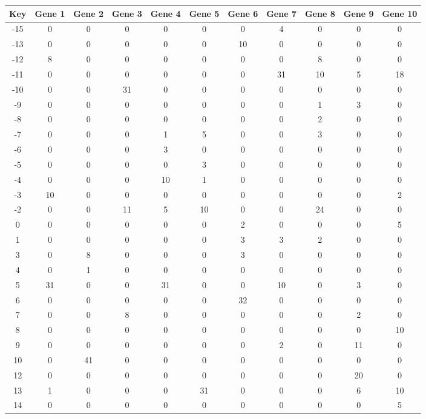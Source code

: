 \begin{tabular}{|c|c|c|c|c|c|c|c|c|c|c|}
\hline
Key & Gene 1 & Gene 2 & Gene 3 & Gene 4 & Gene 5 & Gene 6 & Gene 7 & Gene 8 & Gene 9 & Gene 10 \\
\hline
-15 & 0 & 0 & 0 & 0 & 0 & 0 & 4 & 0 & 0 & 0 \\
-13 & 0 & 0 & 0 & 0 & 0 & 10 & 0 & 0 & 0 & 0 \\
-12 & 8 & 0 & 0 & 0 & 0 & 0 & 0 & 8 & 0 & 0 \\
-11 & 0 & 0 & 0 & 0 & 0 & 0 & 31 & 10 & 5 & 18 \\
-10 & 0 & 0 & 31 & 0 & 0 & 0 & 0 & 0 & 0 & 0 \\
-9 & 0 & 0 & 0 & 0 & 0 & 0 & 0 & 1 & 3 & 0 \\
-8 & 0 & 0 & 0 & 0 & 0 & 0 & 0 & 2 & 0 & 0 \\
-7 & 0 & 0 & 0 & 1 & 5 & 0 & 0 & 3 & 0 & 0 \\
-6 & 0 & 0 & 0 & 3 & 0 & 0 & 0 & 0 & 0 & 0 \\
-5 & 0 & 0 & 0 & 0 & 3 & 0 & 0 & 0 & 0 & 0 \\
-4 & 0 & 0 & 0 & 10 & 1 & 0 & 0 & 0 & 0 & 0 \\
-3 & 10 & 0 & 0 & 0 & 0 & 0 & 0 & 0 & 0 & 2 \\
-2 & 0 & 0 & 11 & 5 & 10 & 0 & 0 & 24 & 0 & 0 \\
0 & 0 & 0 & 0 & 0 & 0 & 2 & 0 & 0 & 0 & 5 \\
1 & 0 & 0 & 0 & 0 & 0 & 3 & 3 & 2 & 0 & 0 \\
3 & 0 & 8 & 0 & 0 & 0 & 3 & 0 & 0 & 0 & 0 \\
4 & 0 & 1 & 0 & 0 & 0 & 0 & 0 & 0 & 0 & 0 \\
5 & 31 & 0 & 0 & 31 & 0 & 0 & 10 & 0 & 3 & 0 \\
6 & 0 & 0 & 0 & 0 & 0 & 32 & 0 & 0 & 0 & 0 \\
7 & 0 & 0 & 8 & 0 & 0 & 0 & 0 & 0 & 2 & 0 \\
8 & 0 & 0 & 0 & 0 & 0 & 0 & 0 & 0 & 0 & 10 \\
9 & 0 & 0 & 0 & 0 & 0 & 0 & 2 & 0 & 11 & 0 \\
10 & 0 & 41 & 0 & 0 & 0 & 0 & 0 & 0 & 0 & 0 \\
12 & 0 & 0 & 0 & 0 & 0 & 0 & 0 & 0 & 20 & 0 \\
13 & 1 & 0 & 0 & 0 & 31 & 0 & 0 & 0 & 6 & 10 \\
14 & 0 & 0 & 0 & 0 & 0 & 0 & 0 & 0 & 0 & 5 \\
\hline
\end{tabular}